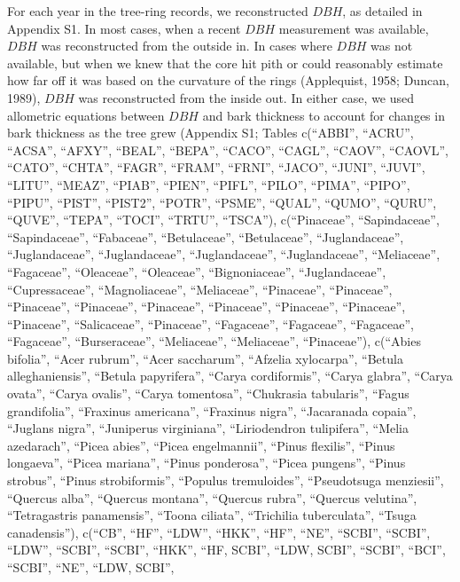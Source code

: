 \documentclass[
]{article}
\begin{document}
For each year in the tree-ring records, we reconstructed \(DBH\), as
detailed in Appendix S1. In most cases, when a recent \(DBH\)
measurement was available, \(DBH\) was reconstructed from the outside
in. In cases where \(DBH\) was not available, but when we knew that the
core hit pith or could reasonably estimate how far off it was based on
the curvature of the rings (Applequist, 1958; Duncan, 1989), \(DBH\) was
reconstructed from the inside out. In either case, we used allometric
equations between \(DBH\) and bark thickness to account for changes in
bark thickness as the tree grew (Appendix S1; Tables c(``ABBI'',
``ACRU'', ``ACSA'', ``AFXY'', ``BEAL'', ``BEPA'', ``CACO'', ``CAGL'',
``CAOV'', ``CAOVL'', ``CATO'', ``CHTA'', ``FAGR'', ``FRAM'', ``FRNI'',
``JACO'', ``JUNI'', ``JUVI'', ``LITU'', ``MEAZ'', ``PIAB'', ``PIEN'',
``PIFL'', ``PILO'', ``PIMA'', ``PIPO'', ``PIPU'', ``PIST'', ``PIST2'',
``POTR'', ``PSME'', ``QUAL'', ``QUMO'', ``QURU'', ``QUVE'', ``TEPA'',
``TOCI'', ``TRTU'', ``TSCA''), c(``Pinaceae'', ``Sapindaceae'',
``Sapindaceae'', ``Fabaceae'', ``Betulaceae'', ``Betulaceae'',
``Juglandaceae'', ``Juglandaceae'', ``Juglandaceae'', ``Juglandaceae'',
``Juglandaceae'', ``Meliaceae'', ``Fagaceae'', ``Oleaceae'',
``Oleaceae'', ``Bignoniaceae'', ``Juglandaceae'', ``Cupressaceae'',
``Magnoliaceae'', ``Meliaceae'', ``Pinaceae'', ``Pinaceae'',
``Pinaceae'', ``Pinaceae'', ``Pinaceae'', ``Pinaceae'', ``Pinaceae'',
``Pinaceae'', ``Pinaceae'', ``Salicaceae'', ``Pinaceae'', ``Fagaceae'',
``Fagaceae'', ``Fagaceae'', ``Fagaceae'', ``Burseraceae'',
``Meliaceae'', ``Meliaceae'', ``Pinaceae''), c(``Abies bifolia'', ``Acer
rubrum'', ``Acer saccharum'', ``Afzelia xylocarpa'', ``Betula
alleghaniensis'', ``Betula papyrifera'', ``Carya cordiformis'', ``Carya
glabra'', ``Carya ovata'', ``Carya ovalis'', ``Carya tomentosa'',
``Chukrasia tabularis'', ``Fagus grandifolia'', ``Fraxinus americana'',
``Fraxinus nigra'', ``Jacaranada copaia'', ``Juglans nigra'',
``Juniperus virginiana'', ``Liriodendron tulipifera'', ``Melia
azedarach'', ``Picea abies'', ``Picea engelmannii'', ``Pinus flexilis'',
``Pinus longaeva'', ``Picea mariana'', ``Pinus ponderosa'', ``Picea
pungens'', ``Pinus strobus'', ``Pinus strobiformis'', ``Populus
tremuloides'', ``Pseudotsuga menziesii'', ``Quercus alba'', ``Quercus
montana'', ``Quercus rubra'', ``Quercus velutina'', ``Tetragastris
panamensis'', ``Toona ciliata'', ``Trichilia tuberculata'', ``Tsuga
canadensis''), c(``CB'', ``HF'', ``LDW'', ``HKK'', ``HF'', ``NE'',
``SCBI'', ``SCBI'', ``LDW'', ``SCBI'', ``SCBI'', ``HKK'', ``HF, SCBI'',
``LDW, SCBI'', ``SCBI'', ``BCI'', ``SCBI'', ``NE'', ``LDW, SCBI'',
\end{document}
